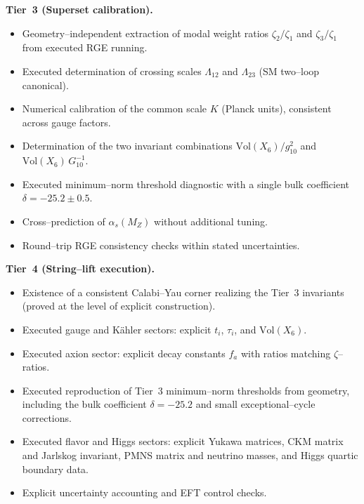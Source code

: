 \documentclass[11pt]{article}
\begin{document}
\noindent\textbf{Tier~3 (Superset calibration).}
\begin{itemize}
  \item Geometry--independent extraction of modal weight ratios
        $\zeta_2/\zeta_1$ and $\zeta_3/\zeta_1$ from executed RGE running.
  \item Executed determination of crossing scales
        $\Lambda_{12}$ and $\Lambda_{23}$ (SM two--loop canonical).
  \item Numerical calibration of the common scale $K$ (Planck units),
        consistent across gauge factors.
  \item Determination of the two invariant combinations
        $\mathrm{Vol}(X_6)/g_{10}^2$ and
        $\mathrm{Vol}(X_6)\,G_{10}^{-1}$.
  \item Executed minimum--norm threshold diagnostic with a single bulk
        coefficient $\delta = -25.2 \pm 0.5$.
  \item Cross--prediction of $\alpha_s(M_Z)$ without additional tuning.
  \item Round--trip RGE consistency checks within stated uncertainties.
\end{itemize}


\noindent\textbf{Tier~4 (String--lift execution).}
\begin{itemize}
  \item Existence of a consistent Calabi--Yau corner realizing the
        Tier~3 invariants (proved at the level of explicit construction).
  \item Executed gauge and K\"ahler sectors:
        explicit $t_i$, $\tau_i$, and $\mathrm{Vol}(X_6)$.
  \item Executed axion sector:
        explicit decay constants $f_a$ with ratios matching
        $\zeta$--ratios.
  \item Executed reproduction of Tier~3 minimum--norm thresholds from
        geometry, including the bulk coefficient $\delta=-25.2$ and
        small exceptional--cycle corrections.
  \item Executed flavor and Higgs sectors:
        explicit Yukawa matrices, CKM matrix and Jarlskog invariant,
        PMNS matrix and neutrino masses, and Higgs quartic boundary data.
  \item Explicit uncertainty accounting and EFT control checks.
\end{itemize}


\end{document}
